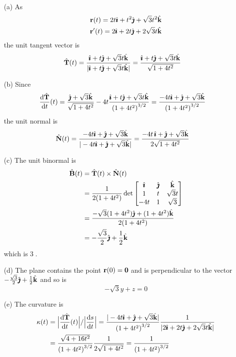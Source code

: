\begin{solution} (a)
As
\begin{align*}
\mathbf{r}(t) = 2t\hat{\pmb{\imath}} + t^2\hat{\pmb{\jmath}} + \sqrt{3} t^2\hat{\mathbf{k}} \\
\mathbf{r}'(t) = 2\hat{\pmb{\imath}} + 2t\hat{\pmb{\jmath}} + 2\sqrt{3} t\hat{\mathbf{k}} 
\end{align*}
the unit tangent vector is
\begin{align*}
\hat{\mathbf{T}}(t) &=\frac{\hat{\pmb{\imath}} + t\hat{\pmb{\jmath}} + \sqrt{3} t\hat{\mathbf{k}} }{|\hat{\pmb{\imath}} + t\hat{\pmb{\jmath}} + \sqrt{3} t\hat{\mathbf{k}} |}
=\frac{\hat{\pmb{\imath}} + t\hat{\pmb{\jmath}} + \sqrt{3} t\hat{\mathbf{k}} }{\sqrt{1+4t^2}}
\end{align*}


\noindent (b)
Since
\begin{align*}
\diff{\hat\vT}{t}(t)
&=\frac{ \hj + \sqrt{3} \hk }{\sqrt{1+4t^2}}
-4t\frac{\hi + t\hj + \sqrt{3} t\hk }{{(1+4t^2)}^{3/2}}
=\frac{-4t\hi + \hj + \sqrt{3} \hk }{{(1+4t^2)}^{3/2}}
\end{align*}
the unit normal is
\begin{align*}
\hat{\mathbf{N}}(t) &=\frac{-4t\hat{\pmb{\imath}} + \hat{\pmb{\jmath}} + \sqrt{3} \hat{\mathbf{k}} }
           {|-4t\hat{\pmb{\imath}} + \hat{\pmb{\jmath}} + \sqrt{3} \hat{\mathbf{k}}|}
=\frac{-4t\,\hat{\pmb{\imath}} + \hat{\pmb{\jmath}} + \sqrt{3} \hat{\mathbf{k}} }{2\sqrt{1+4t^2}}
\end{align*}

\noindent (c) 
The unit binormal is
\begin{align*}
\hat{\mathbf{B}}(t) &= \hat{\mathbf{T}}(t)\times \hat{\mathbf{N}}(t) \\
&=\frac{1}{2(1+4t^2)}\det\left[\begin{matrix}
           \hat{\pmb{\imath}} &  \hat{\pmb{\jmath}} & \hat{\mathbf{k}} \\
           1   &   t  &\sqrt{3} t \\
           -4t &   1  &\sqrt{3}
\end{matrix}\right] \\
&=\frac{-\sqrt{3}(1+4t^2)\hat{\pmb{\jmath}}  + (1+4t^2)\hat{\mathbf{k}}}{2(1+4t^2)} \\
&=-\frac{\sqrt{3}}{2}\hat{\pmb{\jmath}} +\frac{1}{2}\hat{\mathbf{k}}
\end{align*}
which is \textcircled{3}.

\noindent (d)
The plane contains the point $\mathbf{r}(0)=\mathbf{0}$ and is perpendicular to the
vector $-\frac{\sqrt{3}}{2}\hat{\pmb{\jmath}} +\frac{1}{2}\hat{\mathbf{k}}$ and so is
\begin{equation*}
-\sqrt{3} y + z=0
\end{equation*}

\noindent (e)
The curvature is
\begin{align*}
\ka(t) &= \Big|\diff{\hat\vT}{t}(t)\Big|/\Big|\diff{s}{t}\Big|
=\frac{|-4t\hi + \hj + \sqrt{3} \hk| }{{(1+4t^2)}^{3/2}}
  \frac{1}{|2\hi + 2t\hj + 2\sqrt{3} t\hk |} \\
&=\frac{\sqrt{4+16t^2}}{{(1+4t^2)}^{3/2}}  \frac{1}{2\sqrt{1+4t^2}}
=\frac{1}{{(1+4t^2)}^{3/2}}
\end{align*}


\end{solution}
